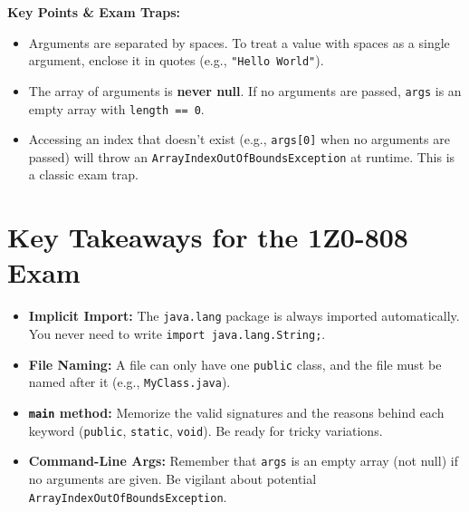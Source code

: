 \documentclass[12pt]{article}
\begin{document}
\begin{enumerate}[label=(\arabic*)]
\begin{enumerate}
\end{enumerate}

\textbf{Key Points & Exam Traps:}
\begin{itemize}
    \item Arguments are separated by spaces. To treat a value with spaces as a single argument, enclose it in quotes (e.g., \texttt{"Hello World"}).
    \item The array of arguments is \textbf{never null}. If no arguments are passed, \texttt{args} is an empty array with \texttt{length == 0}.
    \item Accessing an index that doesn't exist (e.g., \texttt{args[0]} when no arguments are passed) will throw an \texttt{ArrayIndexOutOfBoundsException} at runtime. This is a classic exam trap.
\end{itemize}

\section{Key Takeaways for the 1Z0-808 Exam}
\begin{itemize}
    \item \textbf{Implicit Import:} The \texttt{java.lang} package is always imported automatically. You never need to write \texttt{import java.lang.String;}.
    \item \textbf{File Naming:} A file can only have one \texttt{public} class, and the file must be named after it (e.g., \texttt{MyClass.java}).
    \item \textbf{\texttt{main} method:} Memorize the valid signatures and the reasons behind each keyword (\texttt{public}, \texttt{static}, \texttt{void}). Be ready for tricky variations.
    \item \textbf{Command-Line Args:} Remember that \texttt{args} is an empty array (not null) if no arguments are given. Be vigilant about potential \texttt{ArrayIndexOutOfBoundsException}.
\end{itemize}
\end{enumerate}
\end{document}

